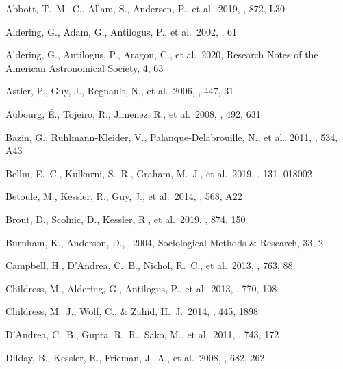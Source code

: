 \documentclass[referee]{aa}
\begin{document}

\begin{thebibliography}{} 

 Abbott, T.~M.~C., Allam, S.,
Andersen, P., et al.\ 2019, \apjl, 872, L30

 Aldering, G., Adam, G., Antilogus,
P., et al.\ 2002, \procspie, 61

 Aldering, G., Antilogus, P.,
Aragon, C., et al.\ 2020, Research Notes of the American Astronomical Society,
4, 63

 Astier, P., Guy, J., Regnault, N., et
al.\ 2006, \aap, 447, 31

 Aubourg, {\'E}., Tojeiro, R.,
Jimenez, R., et al.\ 2008, \aap, 492, 631 


 Bazin, G., Ruhlmann-Kleider, V.,
Palanque-Delabrouille, N., et al.\ 2011, \aap, 534, A43

 Bellm, E.~C., Kulkarni, S.~R., Graham,
M.~J., et al.\ 2019, \pasp, 131, 018002

 Betoule, M., Kessler, R., Guy, J.,
et al.\ 2014, \aap, 568, A22

 Brout, D., Scolnic, D., Kessler, R., et
al.\ 2019, \apj, 874, 150

 Burnham, K., Anderson, D., \
2004, Sociological Methods \& Research, 33, 2


 Campbell, H., D'Andrea, C.~B.,
Nichol, R.~C., et al.\ 2013, \apj, 763, 88

 Childress, M., Aldering, G.,
Antilogus, P., et al.\ 2013, \apj, 770, 108

 Childress, M.~J., Wolf, C., \&
Zahid, H.~J.\ 2014, \mnras, 445, 1898


 D'Andrea, C.~B., Gupta, R.~R.,
Sako, M., et al.\ 2011, \apj, 743, 172

 Dilday, B., Kessler, R., Frieman,
J.~A., et al.\ 2008, \apj, 682, 262


\end{thebibliography}
\end{document}
